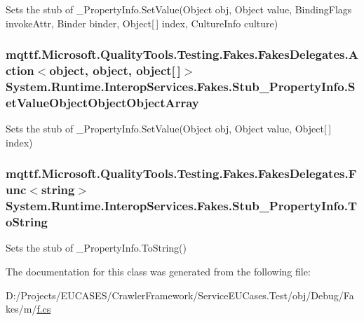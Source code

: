 Sets the stub of \-\_\-\-Property\-Info.\-Set\-Value(\-Object obj, Object value, Binding\-Flags invoke\-Attr, Binder binder, Object\mbox{[}$\,$\mbox{]} index, Culture\-Info culture)

\hypertarget{class_system_1_1_runtime_1_1_interop_services_1_1_fakes_1_1_stub___property_info_a48542b4cffab0adf6822515caf1460ff}{
\subsubsection[{Set\-Value\-Object\-Object\-Object\-Array}]{\setlength{\rightskip}{0pt plus 5cm}mqttf.\-Microsoft.\-Quality\-Tools.\-Testing.\-Fakes.\-Fakes\-Delegates.\-Action$<$object, object, object\mbox{[}$\,$\mbox{]}$>$ System.\-Runtime.\-Interop\-Services.\-Fakes.\-Stub\-\_\-\-Property\-Info.\-Set\-Value\-Object\-Object\-Object\-Array}}\label{class_system_1_1_runtime_1_1_interop_services_1_1_fakes_1_1_stub___property_info_a48542b4cffab0adf6822515caf1460ff}


Sets the stub of \-\_\-\-Property\-Info.\-Set\-Value(\-Object obj, Object value, Object\mbox{[}$\,$\mbox{]} index)

\hypertarget{class_system_1_1_runtime_1_1_interop_services_1_1_fakes_1_1_stub___property_info_a150b90b4bbbb0acb9f5c67f21a929142}{
\subsubsection[{To\-String}]{\setlength{\rightskip}{0pt plus 5cm}mqttf.\-Microsoft.\-Quality\-Tools.\-Testing.\-Fakes.\-Fakes\-Delegates.\-Func$<$string$>$ System.\-Runtime.\-Interop\-Services.\-Fakes.\-Stub\-\_\-\-Property\-Info.\-To\-String}}\label{class_system_1_1_runtime_1_1_interop_services_1_1_fakes_1_1_stub___property_info_a150b90b4bbbb0acb9f5c67f21a929142}


Sets the stub of \-\_\-\-Property\-Info.\-To\-String()



The documentation for this class was generated from the following file\-:\begin{DoxyCompactItemize}
\item 
D\-:/\-Projects/\-E\-U\-C\-A\-S\-E\-S/\-Crawler\-Framework/\-Service\-E\-U\-Cases.\-Test/obj/\-Debug/\-Fakes/m/\hyperlink{m_2f_8cs}{f.\-cs}\end{DoxyCompactItemize}
